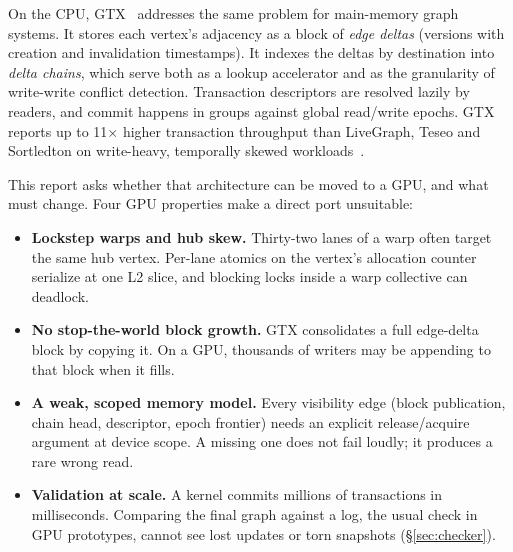 \documentclass[sigconf,nonacm]{acmart}
\begin{document}
On the CPU, GTX~\cite{gtx} addresses the same problem for main-memory graph systems. It stores each vertex's adjacency
as a block of \emph{edge deltas} (versions with creation and invalidation timestamps). It indexes the deltas by
destination into \emph{delta chains}, which serve both as a lookup accelerator and as the granularity of write-write
conflict detection. Transaction descriptors are resolved lazily by readers, and commit happens in groups against
global read/write epochs. GTX reports up to 11$\times$ higher transaction throughput than LiveGraph, Teseo and
Sortledton on write-heavy, temporally skewed workloads~\cite{gtx,livegraph,teseo,sortledton}.

This report asks whether that architecture can be moved to a GPU, and what must change. Four GPU properties make a
direct port unsuitable:
\begin{itemize}
\item \textbf{Lockstep warps and hub skew.} Thirty-two lanes of a warp often target the same hub vertex. Per-lane
atomics on the vertex's allocation counter serialize at one L2 slice, and blocking locks inside a warp collective can
deadlock.
\item \textbf{No stop-the-world block growth.} GTX consolidates a full edge-delta block by copying it. On a GPU,
thousands of writers may be appending to that block when it fills.
\item \textbf{A weak, scoped memory model.} Every visibility edge (block publication, chain head, descriptor, epoch
frontier) needs an explicit release/acquire argument at device scope. A missing one does not fail loudly; it produces
a rare wrong read.
\item \textbf{Validation at scale.} A kernel commits millions of transactions in milliseconds. Comparing the final graph
against a log, the usual check in GPU prototypes, cannot see lost updates or torn snapshots (\S\ref{sec:checker}).
\end{itemize}
\end{document}
